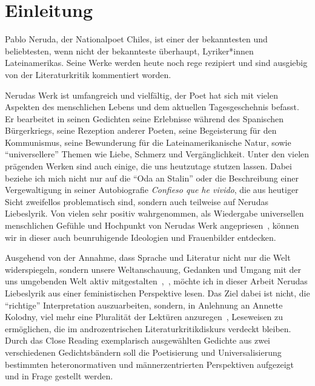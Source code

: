 \section{Einleitung}

Pablo Neruda, der Nationalpoet Chiles, ist einer der bekanntesten und beliebtesten, wenn nicht der bekannteste überhaupt, Lyriker*innen Lateinamerikas.
Seine Werke werden heute noch rege rezipiert und sind ausgiebig von der Literaturkritik kommentiert worden.


Nerudas Werk ist umfangreich und vielfältig, der Poet hat sich mit vielen Aspekten des menschlichen Lebens und dem aktuellen Tagesgeschehnis befasst.
Er bearbeitet in seinen Gedichten seine Erlebnisse während des Spanischen Bürgerkriegs, seine Rezeption anderer Poeten, seine Begeisterung für den Kommunismus, seine Bewunderung für die Lateinamerikanische Natur, sowie ``universellere'' Themen wie Liebe, Schmerz und Vergänglichkeit.
Unter den vielen prägenden Werken sind auch einige, die uns heutzutage stutzen lassen.
Dabei beziehe ich mich nicht nur auf die ``Oda an Stalin'' oder die Beschreibung einer Vergewaltigung in seiner Autobiografie \textit{Confieso que he vivido}, die aus heutiger Sicht zweifellos problematisch sind, sondern auch teilweise auf Nerudas Liebeslyrik.
Von vielen sehr positiv wahrgenommen, als Wiedergabe universellen menschlichen Gefühle und Hochpunkt von Nerudas Werk angepriesen~\cite{Eandi}, %
können wir in dieser auch beunruhigende Ideologien und Frauenbilder entdecken.


Ausgehend von der Annahme, dass Sprache und Literatur nicht nur die Welt widerspiegeln, sondern unsere Weltanschauung, Gedanken und Umgang mit der uns umgebenden Welt aktiv mitgestalten~\cite{Kolodny1980},~\cite{North2013},
möchte ich in dieser Arbeit Nerudas Liebeslyrik aus einer feministischen Perspektive lesen.
Das Ziel dabei ist nicht, die ``richtige'' Interpretation auszuarbeiten, sondern, in Anlehnung an Annette Kolodny, viel mehr eine Pluralität der Lektüren anzuregen~\cite{Kolodny1980}, Leseweisen zu ermöglichen, die im androzentrischen Literaturkritikdiskurs verdeckt bleiben.
Durch das Close Reading exemplarisch ausgewählten Gedichte aus zwei verschiedenen Gedichtsbändern soll die Poetisierung und Universalisierung bestimmten heteronormativen und männerzentrierten Perspektiven aufgezeigt und in Frage gestellt werden.


